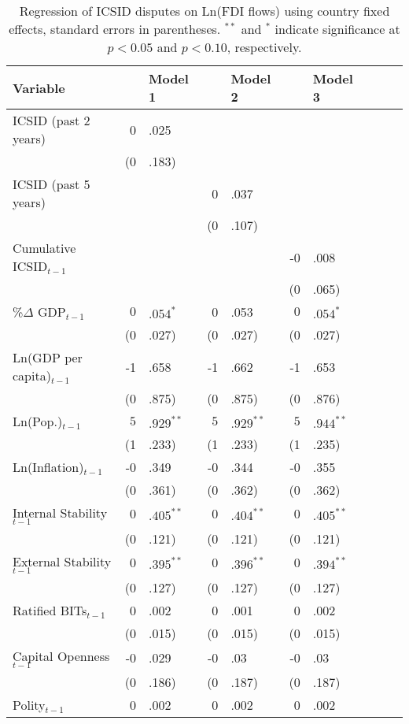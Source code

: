 \documentclass[12pt,onesided]{amsart}
\begin{document}
\begin{table}[ht]
\centering
\caption{Regression of ICSID disputes on Ln(FDI flows) using country fixed effects, standard errors in parentheses. $^{**}$ and $^{*}$ indicate significance at $p< 0.05 $ and $p< 0.10 $, respectively.} 
\label{tab:dispFDI}
{\footnotesize
\begin{tabular}{lr@{} lr@{}lr@{}lr@{}lr@{}}
 Variable && Model 1 && Model 2 && Model 3 \\ 
  \hline
\hline
ICSID  (past 2 years) & 0&.025 &&  &&  \\ 
   & (0&.183) &&  &&  \\ 
  ICSID  (past 5 years) &&  & 0&.037 &&  \\ 
   &&  & (0&.107) &&  \\ 
  Cumulative ICSID$_{t-1}$ &&  &&  & -0&.008 \\ 
   &&  &&  & (0&.065) \\ 
  \%$\Delta$ GDP$_{t-1}$ & $0$&$.054^{\ast}$ & 0&.053 & $0$&$.054^{\ast}$ \\ 
   & (0&.027) & (0&.027) & (0&.027) \\ 
  Ln(GDP per capita)$_{t-1}$ & -1&.658 & -1&.662 & -1&.653 \\ 
   & (0&.875) & (0&.875) & (0&.876) \\ 
  Ln(Pop.)$_{t-1}$ & $5$&$.929^{\ast\ast}$ & $5$&$.929^{\ast\ast}$ & $5$&$.944^{\ast\ast}$ \\ 
   & (1&.233) & (1&.233) & (1&.235) \\ 
  Ln(Inflation)$_{t-1}$ & -0&.349 & -0&.344 & -0&.355 \\ 
   & (0&.361) & (0&.362) & (0&.362) \\ 
  Internal Stability$_{t-1}$ & $0$&$.405^{\ast\ast}$ & $0$&$.404^{\ast\ast}$ & $0$&$.405^{\ast\ast}$ \\ 
   & (0&.121) & (0&.121) & (0&.121) \\ 
  External Stability$_{t-1}$ & $0$&$.395^{\ast\ast}$ & $0$&$.396^{\ast\ast}$ & $0$&$.394^{\ast\ast}$ \\ 
   & (0&.127) & (0&.127) & (0&.127) \\ 
  Ratified BITs$_{t-1}$ & 0&.002 & 0&.001 & 0&.002 \\ 
   & (0&.015) & (0&.015) & (0&.015) \\ 
  Capital Openness$_{t-1}$ & -0&.029 & -0&.03 & -0&.03 \\ 
   & (0&.186) & (0&.187) & (0&.187) \\ 
  Polity$_{t-1}$ & 0&.002 & 0&.002 & 0&.002 \\ 

\end{tabular}}
\end{table}
\end{document}
